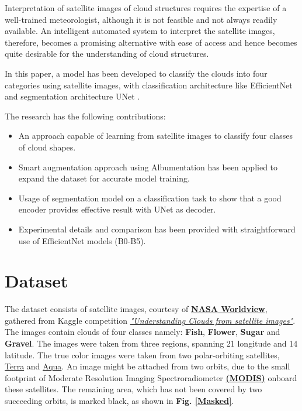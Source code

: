 \documentclass[conference]{IEEEtran}
\begin{document}
Interpretation of satellite images of cloud structures requires the expertise of a well-trained meteorologist, although it is not feasible and not always readily available. An intelligent automated system to interpret the satellite images, therefore, becomes a promising alternative with ease of access and hence becomes quite desirable for the understanding of cloud structures. 

In this paper, a model has been developed to classify the clouds into four categories using satellite images, with classification architecture like EfficientNet and segmentation architecture UNet \cite{tan2019efficientnet,ronneberger2015u}.

The research has the following contributions:
\begin{itemize}
    \item An approach capable of learning from satellite images to classify four classes of cloud shapes.
    \item Smart augmentation approach using Albumentation has been applied to expand the dataset for accurate model training.
    \item Usage of segmentation model on a classification task to show that a good encoder provides effective result with UNet as decoder.
    \item Experimental details and comparison has been provided with straightforward use of EfficientNet models (B0-B5).
\end{itemize}











\section{Dataset \label{dataset}}

The dataset consists of satellite images, courtesy of \href{https://worldview.earthdata.nasa.gov/}{ \textbf{NASA Worldview}}, gathered from Kaggle competition \href{https://www.kaggle.com/c/understanding_cloud_organization/data}{\textit{"Understanding Clouds from satellite images"}}. The images contain clouds of four classes namely: \textbf{Fish}, \textbf{Flower}, \textbf{Sugar} and \textbf{Gravel}. The images were taken from three regions, spanning 21 longitude and 14 latitude. The true color images were taken from two polar-orbiting satellites, \href{https://en.wikipedia.org/wiki/Terra_(satellite)}{Terra} and \href{https://en.wikipedia.org/wiki/Aqua_(satellite)}{Aqua}. An image might be attached from two orbits, due to the small footprint of Moderate Resolution Imaging Spectroradiometer \href{https://modis.gsfc.nasa.gov/}{\textbf{(MODIS)}} onboard these satellites. The remaining area, which has not been covered by two succeeding orbits, is marked black, as shown in \textbf{Fig. \ref{Masked}}.
\end{document}
